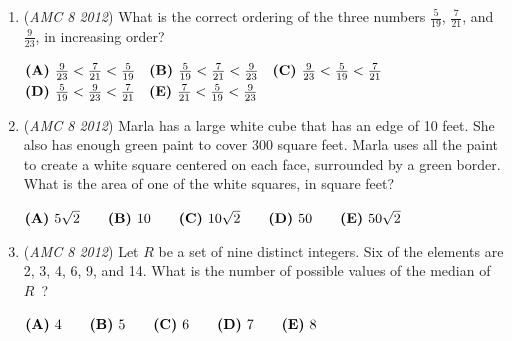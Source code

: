 \begin{enumerate}
 $\textbf{(A)}\hspace{.05in}6\qquad\textbf{(B)}\hspace{.05in}8\qquad\textbf{(C)}\hspace{.05in}9\qquad\textbf{(D)}\hspace{.05in}10\qquad\textbf{(E)}\hspace{.05in}12$


	\item (\textit{AMC 8 2012}) What is the correct ordering of the three numbers $\frac{5}{19}$, $\frac{7}{21}$, and $\frac{9}{23}$, in increasing order?


 $\textbf{(A)}\hspace{.05in}\frac{9}{23}<\frac{7}{21}<\frac{5}{19}\quad\textbf{(B)}\hspace{.05in}\frac{5}{19}<\frac{7}{21}<\frac{9}{23}\quad\textbf{(C)}\hspace{.05in}\frac{9}{23}<\frac{5}{19}<\frac{7}{21}$
$\textbf{(D)}\hspace{.05in}\frac{5}{19}<\frac{9}{23}<\frac{7}{21}\quad\textbf{(E)}\hspace{.05in}\frac{7}{21}<\frac{5}{19}<\frac{9}{23}$


	\item (\textit{AMC 8 2012}) Marla has a large white cube that has an edge of 10 feet. She also has enough green paint to cover 300 square feet. Marla uses all the paint to create a white square centered on each face, surrounded by a green border. What is the area of one of the white squares, in square feet?


 $\textbf{(A)}\hspace{.05in}5\sqrt2\qquad\textbf{(B)}\hspace{.05in}10\qquad\textbf{(C)}\hspace{.05in}10\sqrt2\qquad\textbf{(D)}\hspace{.05in}50\qquad\textbf{(E)}\hspace{.05in}50\sqrt2$


	\item (\textit{AMC 8 2012}) Let $R$  be a set of nine distinct integers. Six of the elements are 2, 3, 4, 6, 9, and 14. What is the number of possible values of the median of $R$ ?


 $\textbf{(A)}\hspace{.05in}4\qquad\textbf{(B)}\hspace{.05in}5\qquad\textbf{(C)}\hspace{.05in}6\qquad\textbf{(D)}\hspace{.05in}7\qquad\textbf{(E)}\hspace{.05in}8$



\end{enumerate}
